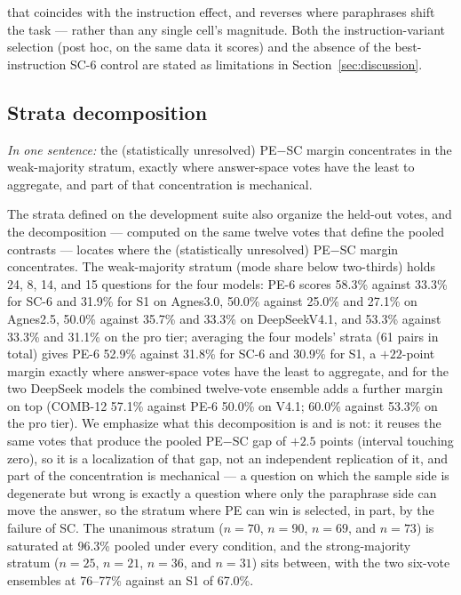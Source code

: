 that coincides with the instruction effect, and reverses where paraphrases shift the task --- rather than any single cell's magnitude. Both the instruction-variant selection (post hoc, on the same data it scores) and the absence of the best-instruction SC-6 control are stated as limitations in Section~\ref{sec:discussion}.

\subsection{Strata decomposition}
\label{sec:heldoutstrata}

\emph{In one sentence:} the (statistically unresolved) PE$-$SC margin concentrates in the weak-majority stratum, exactly where answer-space votes have the least to aggregate, and part of that concentration is mechanical.

The strata defined on the development suite also organize the held-out votes, and the decomposition --- computed on the same twelve votes that define the pooled contrasts --- locates where the (statistically unresolved) PE$-$SC margin concentrates. The weak-majority stratum (mode share below two-thirds) holds 24, 8, 14, and 15 questions for the four models: PE-6 scores 58.3\% against 33.3\% for SC-6 and 31.9\% for S1 on Agnes3.0, 50.0\% against 25.0\% and 27.1\% on Agnes2.5, 50.0\% against 35.7\% and 33.3\% on DeepSeekV4.1, and 53.3\% against 33.3\% and 31.1\% on the pro tier; averaging the four models' strata (61 pairs in total) gives PE-6 52.9\% against 31.8\% for SC-6 and 30.9\% for S1, a $+22$-point margin exactly where answer-space votes have the least to aggregate, and for the two DeepSeek models the combined twelve-vote ensemble adds a further margin on top (COMB-12 57.1\% against PE-6 50.0\% on V4.1; 60.0\% against 53.3\% on the pro tier). We emphasize what this decomposition is and is not: it reuses the same votes that produce the pooled PE$-$SC gap of $+2.5$ points (interval touching zero), so it is a localization of that gap, not an independent replication of it, and part of the concentration is mechanical --- a question on which the sample side is degenerate but wrong is exactly a question where only the paraphrase side can move the answer, so the stratum where PE can win is selected, in part, by the failure of SC. The unanimous stratum ($n=70$, $n=90$, $n=69$, and $n=73$) is saturated at 96.3\% pooled under every condition, and the strong-majority stratum ($n=25$, $n=21$, $n=36$, and $n=31$) sits between, with the two six-vote ensembles at 76--77\% against an S1 of 67.0\%.

